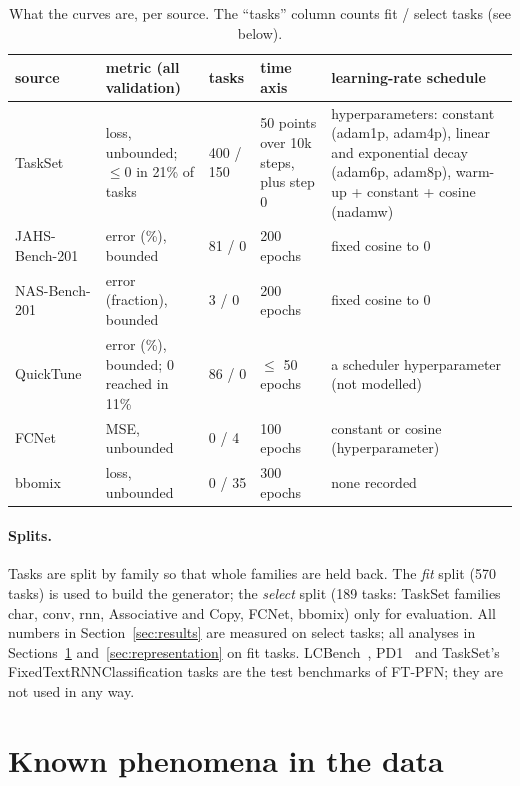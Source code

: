\documentclass[10pt]{article}
\begin{document}
\begin{table}[t]
\centering\small
\caption{What the curves are, per source. The ``tasks'' column counts fit / select tasks (see below).}
\label{tab:data}
\begin{tabular}{p{2.2cm}p{3.2cm}lp{1.4cm}p{5.0cm}}
\toprule
source & metric (all validation) & tasks & time axis & learning-rate schedule \\
\midrule
TaskSet~\cite{metz2020using} & loss, unbounded; $\le 0$ in 21\% of tasks & 400 / 150 & 50 points over 10k steps, plus step 0 &
  hyperparameters: constant (adam1p, adam4p), linear and exponential decay (adam6p, adam8p), warm-up + constant + cosine (nadamw) \\
JAHS-Bench-201~\cite{bansal2022jahs} & error (\%), bounded & 81 / 0 & 200 epochs & fixed cosine to 0 \\
NAS-Bench-201~\cite{dong2020nasbench201} & error (fraction), bounded & 3 / 0 & 200 epochs & fixed cosine to 0 \\
QuickTune~\cite{pineda2024quicktune} & error (\%), bounded; 0 reached in 11\% & 86 / 0 & $\le$ 50 epochs & a scheduler hyperparameter (not modelled) \\
FCNet~\cite{klein2019tabular} & MSE, unbounded & 0 / 4 & 100 epochs & constant or cosine (hyperparameter) \\
bbomix~\cite{salinas2022synetune} & loss, unbounded & 0 / 35 & 300 epochs & none recorded \\
\bottomrule
\end{tabular}
\end{table}

\paragraph{Splits.} Tasks are split by family so that whole families are held back. The \emph{fit} split (570 tasks)
is used to build the generator; the \emph{select} split (189 tasks: TaskSet families char, conv, rnn, Associative and
Copy, FCNet, bbomix) only for evaluation. All numbers in Section~\ref{sec:results} are measured on select tasks; all
analyses in Sections~\ref{sec:phenomena} and~\ref{sec:representation} on fit tasks. LCBench~\cite{zimmer2021autopytorch},
PD1~\cite{wang2024pretrained} and TaskSet's FixedTextRNNClassification tasks are the test benchmarks of FT-PFN; they
are not used in any way.

\section{Known phenomena in the data}
\label{sec:phenomena}
\end{document}
